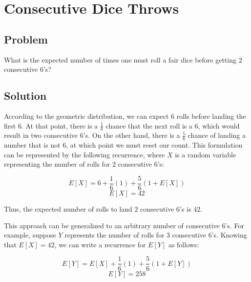 \documentclass{article}
\date{}
\author{Kaan Aksoy | April 28, 2020}
\title{}
\begin{document}
\maketitle
\section{Consecutive Dice Throws}
\subsection{Problem}

What is the expected number of times one must roll a fair dice before 
getting $2$ consecutive $6$'s?

\subsection{Solution}
According to the geometric distribution, we can expect $6$ rolls before 
landing the first $6$. At that point, there is a $\frac{1}{6}$ chance 
that the next roll is a $6$, which would result in two consecutive $6$'s. 
On the other hand, there is a $\frac{5}{6}$ chance of landing a number that is 
not $6$, at which point we must reset our count. This formulation can be 
represented by the following recurrence, where $X$ is a random variable 
representing the number of rolls for $2$ consecutive $6$'s:

$$E[X] = 6 + \frac{1}{6}(1) + \frac{5}{6}(1+E[X])$$
$$E[X] = 42$$

Thus, the expected number of rolls to land $2$ consecutive $6$'s is $42$.

This approach can be generalized to an arbitrary number of consecutive $6$'s. 
For example, suppose $Y$ represents the number of rolls for $3$ consecutive $6$'s. 
Knowing that $E[X] = 42$, we can write a recurrence for $E[Y]$ as follows:

$$E[Y] = E[X] + \frac{1}{6}(1) + \frac{5}{6}(1+E[Y])$$
$$E[Y] = 258$$
\end{document}
